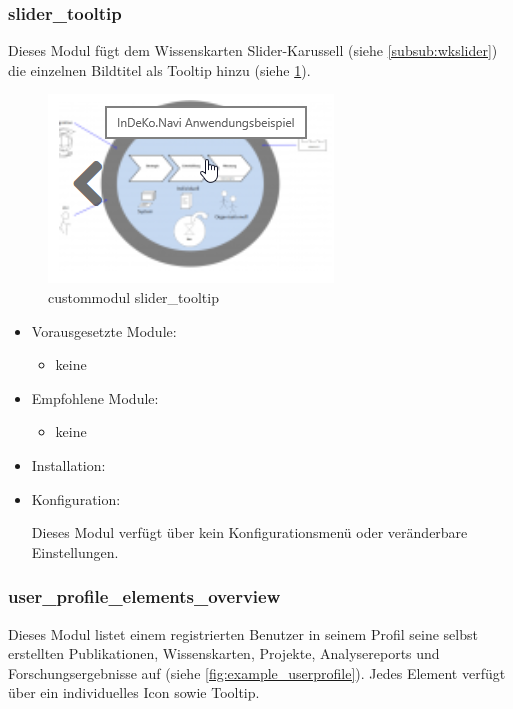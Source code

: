 \newpage
\subsubsection{slider\_tooltip}\label{subsub:slidertooltip}
Dieses Modul fügt dem Wissenskarten Slider-Karussell (siehe \cref{subsub:wkslider}) die einzelnen Bildtitel als Tooltip hinzu (siehe \cref{fig:example_slidertooltip}).

\begin{figure}[H]
	\centering
	\includegraphics[height=0.10\textheight]{images/example_slidertooltip}
	\caption{\gls{custommodul} slider\_tooltip}
	\label{fig:example_slidertooltip}
\end{figure}

\begin{itemize}[parsep=0pt, itemsep=5.0pt plus 2.0pt minus 1.0pt, leftmargin=*]
	\item Vorausgesetzte Module:
	\begin{itemize}
		\item keine
	\end{itemize}

	\item Empfohlene Module:
	\begin{itemize}
		\item keine
	\end{itemize}

	\item Installation: \standardinstall


	\item Konfiguration:

	Dieses Modul verfügt über kein Konfigurationsmenü oder veränderbare Einstellungen.
\end{itemize}


\newpage
\subsubsection{user\_profile\_elements\_overview}\label{subsub:userprofileelementsoverview}
Dieses Modul listet einem registrierten Benutzer in seinem Profil seine selbst erstellten Publikationen, Wissenskarten, Projekte, Analysereports und Forschungsergebnisse auf (siehe \cref{fig:example_userprofile}). Jedes Element verfügt über ein individuelles Icon sowie Tooltip.

